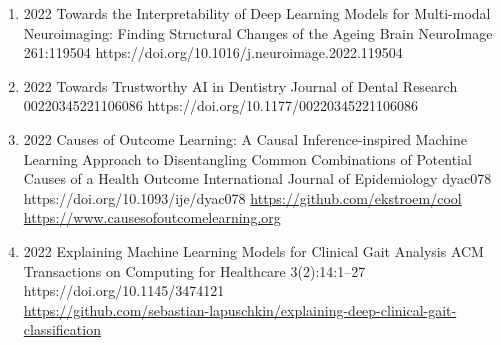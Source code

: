 {\begin{enumerate}
    \item {}
                        {2022}
                        {Towards the Interpretability of Deep Learning Models for Multi-modal Neuroimaging: Finding Structural Changes of the Ageing Brain}
                        {NeuroImage}
                        {261:119504}
                        {https://doi.org/10.1016/j.neuroimage.2022.119504}


    \item {}
                        {2022}
                        {Towards Trustworthy AI in Dentistry}
                        {Journal of Dental Research}
                        {00220345221106086}
                        {https://doi.org/10.1177/00220345221106086}


    \item {}
                        {2022}
                        {Causes of Outcome Learning: A Causal Inference-inspired Machine Learning Approach to Disentangling Common Combinations of Potential Causes of a Health Outcome}
                        {International Journal of Epidemiology}
                        {dyac078}
                        {https://doi.org/10.1093/ije/dyac078}
                        {\href{https://github.com/ekstroem/cool}{https://github.com/ekstroem/cool}\\
                         \href{https://www.causesofoutcomelearning.org}{https://www.causesofoutcomelearning.org}
                        }

    \item {}
                        {2022}
                        {Explaining Machine Learning Models for Clinical Gait Analysis}
                        {ACM Transactions on Computing for Healthcare}
                        {3(2):14:1--27}
                        {https://doi.org/10.1145/3474121}
                        {\\\href{https://github.com/sebastian-lapuschkin/explaining-deep-clinical-gait-classification}{https://github.com/sebastian-lapuschkin/explaining-deep-clinical-gait-classification}}



\end{enumerate}}
